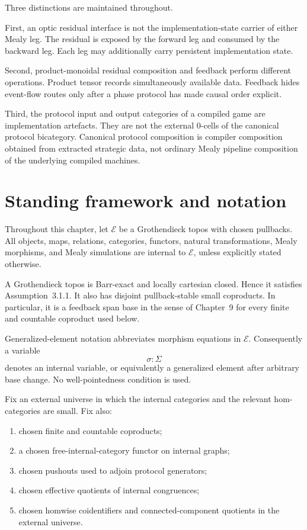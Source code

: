 Three distinctions are maintained throughout.

First, an optic residual interface is not the implementation-state carrier of either Mealy leg. The
residual is exposed by the forward leg and consumed by the backward leg. Each leg may additionally
carry persistent implementation state.

Second, product-monoidal residual composition and feedback perform different operations. Product
tensor records simultaneously available data. Feedback hides event-flow routes only after a phase
protocol has made causal order explicit.

Third, the protocol input and output categories of a compiled game are implementation artefacts.
They are not the external \(0\)-cells of the canonical protocol bicategory. Canonical protocol
composition is compiler composition obtained from extracted strategic data, not ordinary Mealy
pipeline composition of the underlying compiled machines.

\section{Standing framework and notation}
\label{sec:strategic-standing-framework}

Throughout this chapter, let \(\mathcal E\) be a Grothendieck topos with chosen pullbacks. All
objects, maps, relations, categories, functors, natural transformations, Mealy morphisms, and Mealy
simulations are internal to \(\mathcal E\), unless explicitly stated otherwise.

A Grothendieck topos is Barr-exact and locally cartesian closed. Hence it satisfies
Assumption~3.1.1. It also has disjoint pullback-stable small coproducts. In particular, it is a
feedback span base in the sense of Chapter~9 for every finite and countable coproduct used below.

Generalized-element notation abbreviates morphism equations in \(\mathcal E\). Consequently a
variable
\[
  \sigma:\Sigma
\]
denotes an internal variable, or equivalently a generalized element after arbitrary base change. No
well-pointedness condition is used.

Fix an external universe in which the internal categories and the relevant hom-categories are small.
Fix also:

\begin{enumerate}
  \item chosen finite and countable coproducts;
  \item a chosen free-internal-category functor on internal graphs;
  \item chosen pushouts used to adjoin protocol generators;
  \item chosen effective quotients of internal congruences;
  \item chosen homwise coidentifiers and connected-component quotients in the external universe.
\end{enumerate}


